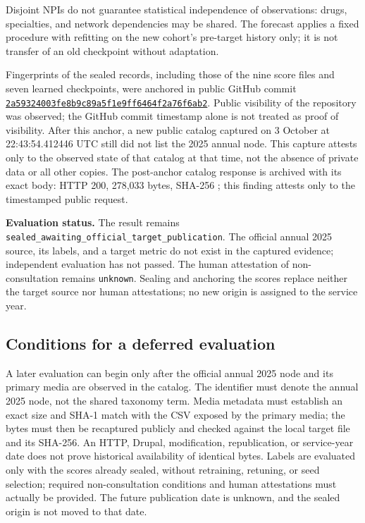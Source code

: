 Disjoint NPIs do not guarantee statistical independence of observations: drugs, specialties, and network dependencies may be shared. The forecast applies a fixed procedure with refitting on the new cohort's pre-target history only; it is not transfer of an old checkpoint without adaptation.

Fingerprints of the sealed records, including those of the nine score files and seven learned checkpoints, were anchored in public GitHub commit \href{https://github.com/carabistouflette/HealthGraphBench/commit/2a59324003fe8b9c89a5f1e9ff6464f2a76f6ab2}{\nolinkurl{2a59324003fe8b9c89a5f1e9ff6464f2a76f6ab2}}. Public visibility of the repository was observed; the GitHub commit timestamp alone is not treated as proof of visibility. After this anchor, a new public catalog captured on 3 October at 22:43:54.412446 UTC still did not list the 2025 annual node. This capture attests only to the observed state of that catalog at that time, not the absence of private data or all other copies.
The post-anchor catalog response is archived with its exact body: HTTP 200, 278,033 bytes, SHA-256 ; this finding attests only to the timestamped public request.

\textbf{Evaluation status.} The result remains \texttt{sealed\_awaiting\_official\_target\_publication}. The official annual 2025 source, its labels, and a target metric do not exist in the captured evidence; independent evaluation has not passed. The human attestation of non-consultation remains \texttt{unknown}. Sealing and anchoring the scores replace neither the target source nor human attestations; no new origin is assigned to the service year.

\subsection{Conditions for a deferred evaluation}

A later evaluation can begin only after the official annual 2025 node and its primary media are observed in the catalog. The identifier must denote the annual 2025 node, not the shared taxonomy term. Media metadata must establish an exact size and SHA-1 match with the CSV exposed by the primary media; the bytes must then be recaptured publicly and checked against the local target file and its SHA-256. An HTTP, Drupal, modification, republication, or service-year date does not prove historical availability of identical bytes. Labels are evaluated only with the scores already sealed, without retraining, retuning, or seed selection; required non-consultation conditions and human attestations must actually be provided. The future publication date is unknown, and the sealed origin is not moved to that date.

